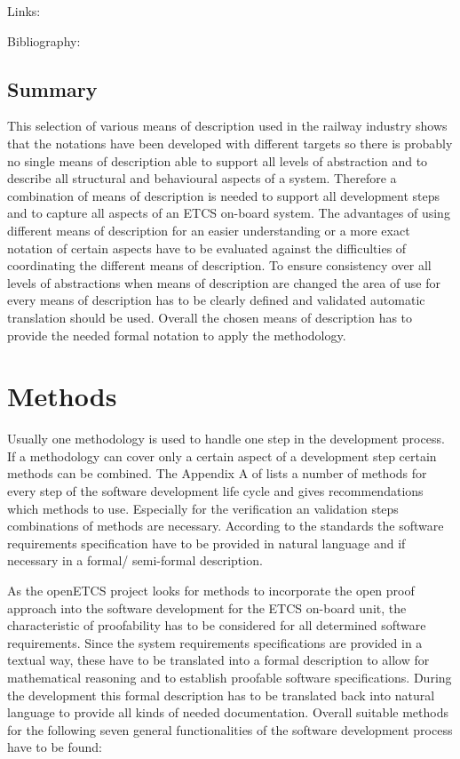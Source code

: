 \documentclass{./template/openetcs2}
\begin{document}
Links:



Bibliography:


\section{Summary}

This selection of various means of description used in the railway industry shows that the notations have been developed with different targets so there is probably no single means of description able to support all levels of abstraction and to describe all structural and behavioural aspects of a system. Therefore a combination of means of description is needed to support all development steps and to capture all aspects of an ETCS on-board system. The advantages of using different means of description for an easier understanding or a more exact notation of certain aspects have to be evaluated against the difficulties of coordinating the different means of description. To ensure consistency over all levels of abstractions when means of description are changed the area of use for every means of description has to be clearly defined and validated automatic translation should be used.  Overall the chosen means of description has to provide the needed formal notation to apply the methodology. 



\chapter{Methods}

\label{chap: methods}

Usually one methodology is used to handle one step in the development process. If a methodology can cover only a certain aspect of a development step certain methods can be combined. The Appendix A of \citeauthor{EN50128:2011} lists a number of methods for every step of the software development life cycle and gives recommendations which methods  to use. Especially for the verification an validation steps combinations of methods are necessary. According to the standards the software requirements specification have to be provided  in natural language and if necessary in a formal/ semi-formal description. 

As the openETCS project looks for methods to incorporate the open proof approach into the software development  for the ETCS on-board unit, the  characteristic of proofability has to be considered for all determined software requirements. Since  the system requirements specifications are provided in a textual way, these have to be translated into a formal description to allow for mathematical reasoning and to establish proofable software specifications. During the development this formal description has to be translated back into natural language to provide all kinds of needed documentation. Overall suitable methods for the following seven general functionalities of the software development process have to be found:
\end{document}
